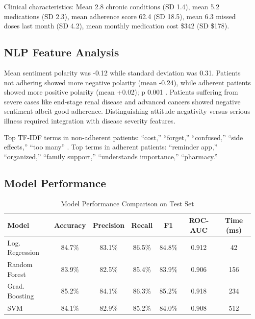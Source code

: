 \documentclass{article}
\begin{document}
Clinical characteristics: Mean 2.8 chronic conditions (SD 1.4), mean 5.2 medications (SD 2.3), mean adherence score 62.4 (SD 18.5), mean 6.3 missed doses last month (SD 4.2), mean monthly medication cost \$342 (SD \$178).

\subsection{NLP Feature Analysis}\label{subsec:nlp-analysis}

Mean sentiment polarity was -0.12 while standard deviation was 0.31. Patients not adhering showed more negative polarity (mean -0.24), while adherent patients showed more positive polarity (mean +0.02); p 0.001 \cite{villanueva2025}. Patients suffering from severe cases like end-stage renal disease and advanced cancers showed negative sentiment albeit good adherence. Distinguishing attitude negativity versus serious illness required integration with disease severity features.

Top TF-IDF terms in non-adherent patients: ``cost,'' ``forget,'' ``confused,'' ``side effects,'' ``too many'' \cite{garg2023}. Top terms in adherent patients: ``reminder app,'' ``organized,'' ``family support,'' ``understands importance,'' ``pharmacy.''

\subsection{Model Performance}\label{subsec:performance}

\begin{table}[h]
\caption{Model Performance Comparison on Test Set}\label{tab:performance}
\begin{tabular*}{\textwidth}{@{\extracolsep\fill}lcccccc@{}}
\toprule
\textbf{Model} & \textbf{Accuracy} & \textbf{Precision} & \textbf{Recall} & \textbf{F1} & \textbf{ROC-AUC} & \textbf{Time (ms)} \\
\midrule
Log. Regression & 84.7\% & 83.1\% & 86.5\% & 84.8\% & 0.912 & 42 \\
Random Forest & 83.9\% & 82.5\% & 85.4\% & 83.9\% & 0.906 & 156 \\
Grad. Boosting & 85.2\% & 84.1\% & 86.3\% & 85.2\% & 0.918 & 234 \\
SVM & 84.1\% & 82.9\% & 85.2\% & 84.0\% & 0.908 & 512 \\
\bottomrule
\end{tabular*}
\end{table}
\end{document}
